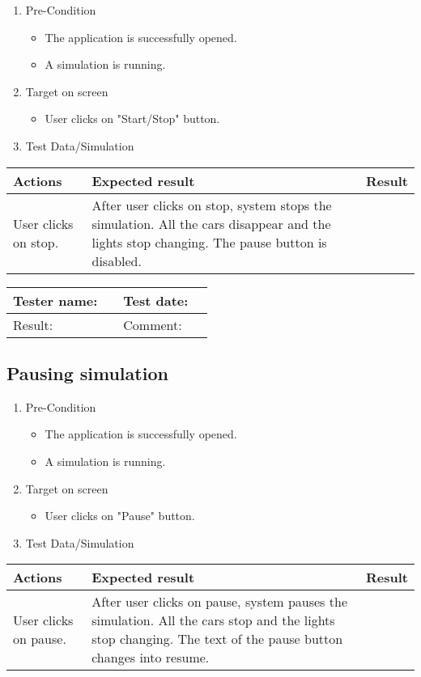 \begin{enumerate}
	\item Pre-Condition
	\begin{itemize}
		\item The application is successfully opened.
		\item A simulation is running.
	\end{itemize}
	\item Target on screen
	\begin{itemize}
		\item User clicks on "Start/Stop" button.
	\end{itemize}
	\item Test Data/Simulation
\end{enumerate}
	\begin{tabularx}{\textwidth}{|X|X|p{2.5cm}|}\hline
	    Actions & Expected result & Result \\\hline
	    User clicks on stop. & After user clicks on stop, system stops the simulation. All the cars disappear and the lights stop changing. The pause button is disabled. & \pass \\\hline    
	\end{tabularx}

\begin{tabularx}{\textwidth}{|p{3cm}X|p{3cm}X|}\hline
	Tester name: &  & Test date: & \\\hline
	Result: &  \pass & Comment: & \\\hline
\end{tabularx}

\newpage

\subsection{Pausing  simulation}

\begin{enumerate}
	\item Pre-Condition
	\begin{itemize}
		\item The application is successfully opened.
		\item A simulation is running.
	\end{itemize}
	\item Target on screen
	\begin{itemize}
		\item User clicks on "Pause" button.
	\end{itemize}
	\item Test Data/Simulation
\end{enumerate}
	\begin{tabularx}{\textwidth}{|X|X|p{2.5cm}|}\hline
		Actions & Expected result & Result \\\hline
		User clicks on pause. & After user clicks on pause, system pauses the simulation. All the cars stop and the lights stop changing. The text of the pause button changes into resume. & \pass \\\hline
	\end{tabularx}

